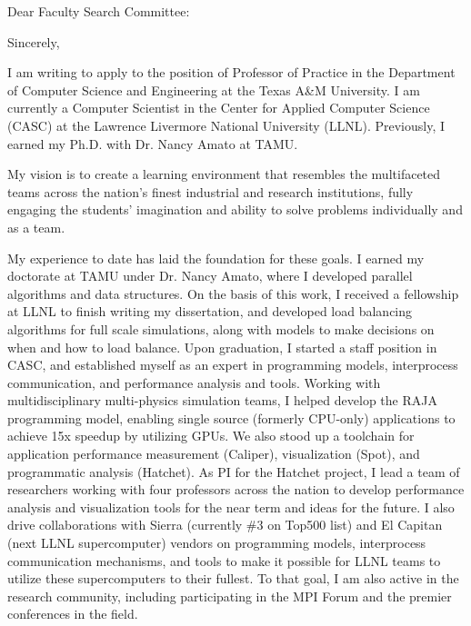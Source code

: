 \documentclass[10pt,letterpaper]{moderncv/moderncv}
\begin{document}
\date{January 20, 2021}
\opening{Dear Faculty Search Committee:}
\closing{Sincerely,}
\makelettertitle%



I am writing to apply to the position of Professor of Practice in the Department of Computer Science and Engineering at the Texas A\&M University.  I am currently a Computer Scientist in the Center for Applied Computer Science (CASC) at the Lawrence Livermore National University (LLNL).  Previously, I earned my Ph.D. with Dr. Nancy Amato at TAMU.

My vision is to create a learning environment that resembles the multifaceted teams across the nation's finest industrial and research institutions,
fully engaging the students' imagination and ability to solve problems individually and as a team.

My experience to date has laid the foundation for these goals.  I earned my doctorate at TAMU under Dr. Nancy Amato, where I developed parallel algorithms and data structures.
On the basis of this work, I received a fellowship at LLNL to finish writing my dissertation,
and developed load balancing algorithms for full scale simulations, along with models to make decisions on when and how to load balance.
Upon graduation, I started a staff position in CASC, and established myself as an expert
in programming models, interprocess communication, and performance analysis and tools.
Working with multidisciplinary multi-physics simulation teams,
I helped develop the RAJA programming model, enabling single source (formerly CPU-only) applications
to achieve 15x speedup by utilizing GPUs.
We also stood up a toolchain for application performance measurement (Caliper),
visualization (Spot), and programmatic analysis (Hatchet).
As PI for the Hatchet project, I lead a team of researchers working with four professors across the nation
to develop performance analysis and visualization tools for the near term and ideas for the future.
I also drive collaborations with Sierra (currently \#3 on Top500 list) and El Capitan (next LLNL supercomputer) vendors
on programming models, interprocess communication mechanisms, and tools to make it possible for LLNL teams to utilize these supercomputers to their fullest.
To that goal, I am also active in the research community, including participating in the MPI Forum and the premier conferences in the field.
\end{document}
